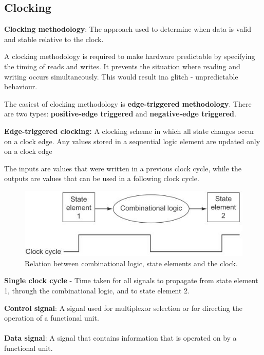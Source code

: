 \documentclass[10pt,a4paper]{article}
\begin{document}
\subsection{Clocking}

\begin{tcolorbox}[breakable,colback=white]
\textbf{Clocking methodology}: The approach used to determine when data is valid and stable relative
to the clock.
\end{tcolorbox}

A clocking methodology is required to make hardware predictable by specifying the timing of reads
and writes. It prevents the situation where reading and writing occurs simultaneously. This would
result ina  glitch - unpredictable behaviour. 

The easiest of clocking methodology is \textbf{edge-triggered methodology}. There are two types:
\textbf{positive-edge triggered} and \textbf{negative-edge triggered}.
\begin{tcolorbox}[breakable,colback=white]
\textbf{Edge-triggered clocking:} A clocking scheme in which all state changes occur on a clock
edge. Any values stored in a sequential logic element are updated only on a clock edge
\end{tcolorbox}

The inputs are values that were written in a previous clock cycle, while the outputs are values 
that can be used in a following clock cycle.
\begin{figure} [h!]
    \centering
    \includegraphics[scale=0.6]{Clocking.JPG}
    \caption{Relation between combinational logic, state elements and the clock.}
\end{figure}

\textbf{Single clock cycle} - Time taken for all signals to propagate from state element 1, through the combinational logic, and to state element 2.

\begin{tcolorbox}[breakable,colback=white]
\textbf{Control signal}: A signal used for multiplexor selection or for directing the operation of a
functional unit.
\\
\\
\textbf{Data signal}: A signal that contains information that is operated on by a functional unit.
\end{tcolorbox}
\end{document}
